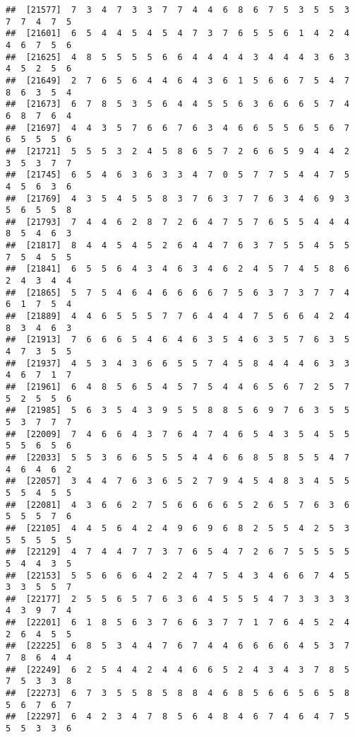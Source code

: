 \documentclass[
]{book}
\begin{document}
\begin{verbatim}
##  [21577]  7  3  4  7  3  3  7  7  4  4  6  8  6  7  5  3  5  5  3  7  7  4  7  5
##  [21601]  6  5  4  4  5  4  5  4  7  3  7  6  5  5  6  1  4  2  4  4  6  7  5  6
##  [21625]  4  8  5  5  5  5  6  6  4  4  4  4  3  4  4  4  3  6  3  4  5  2  5  6
##  [21649]  2  7  6  5  6  4  4  6  4  3  6  1  5  6  6  7  5  4  7  8  6  3  5  4
##  [21673]  6  7  8  5  3  5  6  4  4  5  5  6  3  6  6  6  5  7  4  6  8  7  6  4
##  [21697]  4  4  3  5  7  6  6  7  6  3  4  6  6  5  5  6  5  6  7  6  5  5  5  6
##  [21721]  5  5  5  3  2  4  5  8  6  5  7  2  6  6  5  9  4  4  2  3  5  3  7  7
##  [21745]  6  5  4  6  3  6  3  3  4  7  0  5  7  7  5  4  4  7  5  4  5  6  3  6
##  [21769]  4  3  5  4  5  5  8  3  7  6  3  7  7  6  3  4  6  9  3  5  6  5  5  8
##  [21793]  7  4  4  6  2  8  7  2  6  4  7  5  7  6  5  5  4  4  4  8  5  4  6  3
##  [21817]  8  4  4  5  4  5  2  6  4  4  7  6  3  7  5  5  4  5  5  7  5  4  5  5
##  [21841]  6  5  5  6  4  3  4  6  3  4  6  2  4  5  7  4  5  8  6  2  4  3  4  4
##  [21865]  5  7  5  4  6  4  6  6  6  6  7  5  6  3  7  3  7  7  4  6  1  7  5  4
##  [21889]  4  4  6  5  5  5  7  7  6  4  4  4  7  5  6  6  4  2  4  8  3  4  6  3
##  [21913]  7  6  6  6  5  4  6  4  6  3  5  4  6  3  5  7  6  3  5  4  7  3  5  5
##  [21937]  4  5  3  4  3  6  6  5  5  7  4  5  8  4  4  4  6  3  3  4  6  7  1  7
##  [21961]  6  4  8  5  6  5  4  5  7  5  4  4  6  5  6  7  2  5  7  5  2  5  5  6
##  [21985]  5  6  3  5  4  3  9  5  5  8  8  5  6  9  7  6  3  5  5  5  3  7  7  7
##  [22009]  7  4  6  6  4  3  7  6  4  7  4  6  5  4  3  5  4  5  5  5  5  6  5  6
##  [22033]  5  5  3  6  6  5  5  5  4  4  6  6  8  5  8  5  5  4  7  4  6  4  6  2
##  [22057]  3  4  4  7  6  3  6  5  2  7  9  4  5  4  8  3  4  5  5  5  5  4  5  5
##  [22081]  4  3  6  6  2  7  5  6  6  6  6  5  2  6  5  7  6  3  6  5  5  5  7  6
##  [22105]  4  4  5  6  4  2  4  9  6  9  6  8  2  5  5  4  2  5  3  5  5  5  5  5
##  [22129]  4  7  4  4  7  7  3  7  6  5  4  7  2  6  7  5  5  5  5  5  4  4  3  5
##  [22153]  5  5  6  6  6  4  2  2  4  7  5  4  3  4  6  6  7  4  5  3  3  5  5  7
##  [22177]  2  5  5  6  5  7  6  3  6  4  5  5  5  4  7  3  3  3  3  4  3  9  7  4
##  [22201]  6  1  8  5  6  3  7  6  6  3  7  7  1  7  6  4  5  2  4  2  6  4  5  5
##  [22225]  6  8  5  3  4  4  7  6  7  4  4  6  6  6  6  4  5  3  7  7  8  6  4  4
##  [22249]  6  2  5  4  4  2  4  4  6  6  5  2  4  3  4  3  7  8  5  7  5  3  3  8
##  [22273]  6  7  3  5  5  8  5  8  8  4  6  8  5  6  6  5  6  5  8  5  6  7  6  7
##  [22297]  6  4  2  3  4  7  8  5  6  4  8  4  6  7  4  6  4  7  5  5  5  3  3  6

\end{verbatim}
\end{document}
